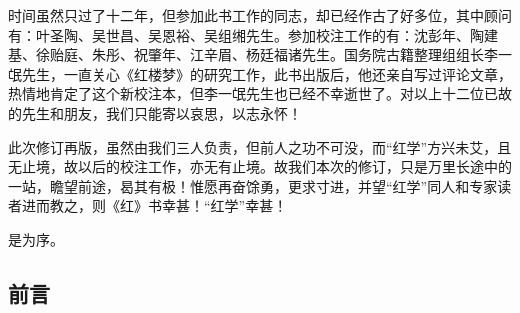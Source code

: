 \par 时间虽然只过了十二年，但参加此书工作的同志，却已经作古了好多位，其中顾问有：叶圣陶、吴世昌、吴恩裕、吴组缃先生。参加校注工作的有：沈彭年、陶建基、徐贻庭、朱彤、祝肇年、江辛眉、杨廷福诸先生。国务院古籍整理组组长李一氓先生，一直关心《红楼梦》的研究工作，此书出版后，他还亲自写过评论文章，热情地肯定了这个新校注本，但李一氓先生也已经不幸逝世了。对以上十二位已故的先生和朋友，我们只能寄以哀思，以志永怀！
\par 此次修订再版，虽然由我们三人负责，但前人之功不可没，而“红学”方兴未艾，且无止境，故以后的校注工作，亦无有止境。故我们本次的修订，只是万里长途中的一站，瞻望前途，曷其有极！惟愿再奋馀勇，更求寸进，并望“红学”同人和专家读者进而教之，则《红》书幸甚！“红学”幸甚！
\par 是为序。
\par {}

\clearpage
\subsection*{前言}


